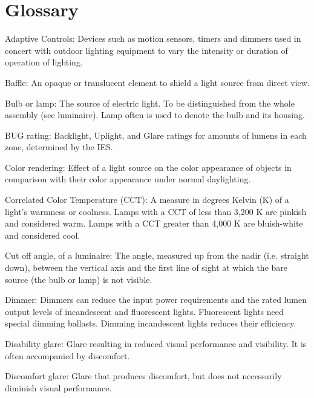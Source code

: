 \documentclass[12pt, oneside]{article}
\begin{document}
\clearpage 
\section{Glossary}
\indent Adaptive Controls: Devices such as motion sensors, timers and dimmers used in concert with outdoor lighting equipment to vary the intensity or duration of operation of lighting.

Baffle: An opaque or translucent element to shield a light source from direct view.

Bulb or lamp: The source of electric light. To be distinguished from the whole assembly (see luminaire). Lamp often is used to denote the bulb and its housing.

BUG rating: Backlight, Uplight, and Glare ratings for amounts of lumens in each zone, determined by the IES.

Color rendering: Effect of a light source on the color appearance of objects in comparison with their color appearance under normal daylighting.

Correlated Color Temperature (CCT): A measure in degrees Kelvin (K) of a light's warmness or coolness. Lamps with a CCT of less than 3,200 K are pinkish and considered warm. Lamps with a CCT greater than 4,000 K are bluish-white and considered cool.

Cut off angle, of a luminaire: The angle, measured up from the nadir (i.e. straight down), between the vertical axis and the first line of sight at which the bare source (the bulb or lamp) is not visible.




Dimmer: Dimmers can reduce the input power requirements and the rated lumen output levels of incandescent and fluorescent lights. Fluorescent lights need special dimming ballasts. Dimming incandescent lights reduces their efficiency.

Disability glare: Glare resulting in reduced visual performance and visibility. It is often accompanied by discomfort.

Discomfort glare: Glare that produces discomfort, but does not necessarily diminish visual performance.
\end{document}
